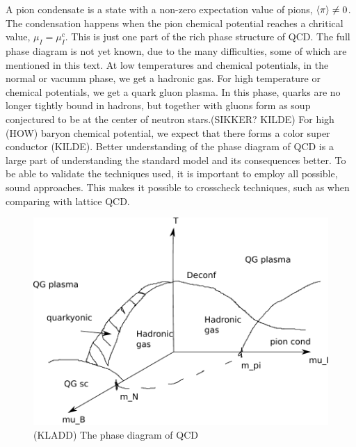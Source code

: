 A pion condensate is a state with a non-zero expectation value of pions, $\ex{\pi} \neq 0$.
The condensation happens when the pion chemical potential reaches a chritical value, $\mu_I = \mu_I^c$.
This is just one part of the rich phase structure of QCD.
The full phase diagram is not yet known, due to the many difficulties, some of which are mentioned in this text.
At low temperatures and chemical potentials, in the normal or vacumm phase, we get a hadronic gas.
For high temperature or chemical potentials, we get a quark gluon plasma.
In this phase, quarks are no longer tightly bound in hadrons, but together with gluons form as soup conjectured to be at the center of neutron stars.(SIKKER? KILDE)
For high (HOW) baryon chemical potential, we expect that there forms a color super conductor (KILDE).
Better understanding of the phase diagram of QCD is a large part of understanding the standard model and its consequences better.
To be able to validate the techniques used, it is important to employ all possible, sound approaches.
This makes it possible to crosscheck techniques, such as when comparing \chpt with lattice QCD.

\begin{figure}
    \centering
    \includegraphics[]{figurer/phase_diagram.pdf}
    \caption{(KLADD) The phase diagram of QCD}
    \label{fig:phase diag qcd}
\end{figure}

